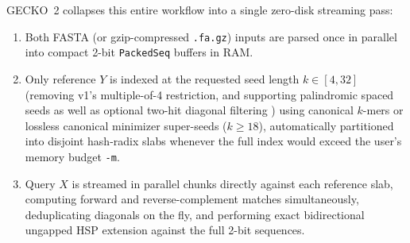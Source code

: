 \documentclass[pdflatex,sn-vancouver,Numbered]{sn-jnl}
\begin{document}
GECKO~2 collapses this entire workflow into a single zero-disk streaming pass:
\begin{enumerate}
    \item Both FASTA (or gzip-compressed \texttt{.fa.gz}) inputs are parsed once in parallel into compact 2-bit \texttt{PackedSeq} buffers in RAM.
    \item Only reference $Y$ is indexed at the requested seed length $k \in [4, 32]$ (removing v1's multiple-of-4 restriction, and supporting palindromic spaced seeds \cite{ma2002patternhunter} as well as optional two-hit diagonal filtering \cite{altschul1997gappedblast}) using canonical $k$-mers or lossless canonical minimizer super-seeds ($k \ge 18$), automatically partitioned into disjoint hash-radix slabs whenever the full index would exceed the user's memory budget \texttt{-m}.
    \item Query $X$ is streamed in parallel chunks directly against each reference slab, computing forward and reverse-complement matches simultaneously, deduplicating diagonals on the fly, and performing exact bidirectional ungapped HSP extension against the full 2-bit sequences.
\end{enumerate}
\end{document}
